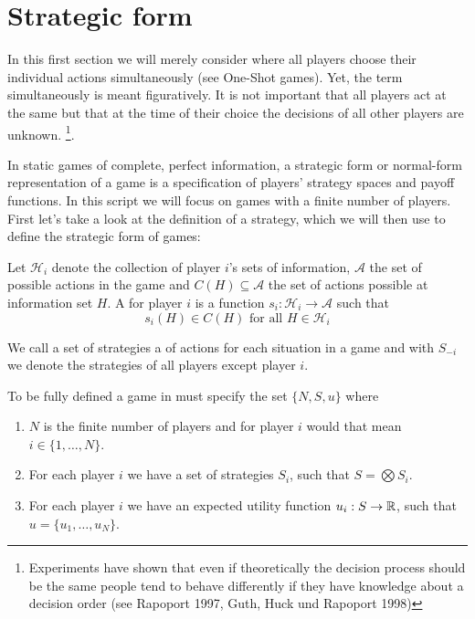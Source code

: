 
\section{Strategic form}

In this first section we will merely consider  where all players choose their individual actions simultaneously (see One-Shot games). Yet, the term simultaneously is meant figuratively. It is not important that all players act at the same but that at the time of their choice the decisions of all other players are unknown. \footnote{Experiments have shown that even if theoretically the decision process should be the same people tend to behave differently if they have knowledge about a decision order  (see Rapoport 1997, Guth, Huck und Rapoport 1998)}.

In static games of complete, perfect information, a strategic form or normal-form representation of a game is a specification of players' strategy spaces and payoff functions. In this script we will focus on games with a finite number of players. \\

First let's take a look at the definition of a strategy, which we will then use to define the strategic form of games: 

\begin{definition}[Strategy]
	Let $\mathcal{H}_{i}$ denote the collection of player $i$'s sets of information, $\mathcal{A}$ the set of possible actions in the game and $C(H) \subseteq \mathcal{A}$ the set of actions possible at information set $H$. A  for player $i$ is a function $s_{i} \colon \mathcal{H}_{i} \rightarrow \mathcal{A}$ such that
	\[ s_{i}(H) \in C(H) \text{ for all } H \in \mathcal{H}_{i} \]
\end{definition}

We call a set of strategies a  of actions for each situation in a game and with $S_{-i}$ we denote the strategies of all players except player $i$.\\

\begin{definition}
To be fully defined a game in  must specify the set $\{ N, S, u \}$ where
	\begin{enumerate}
		\item $N$ is the finite number of players and for player $i$ would that mean $i \in \{ 1, \dotsc, N \}$.
		\item For each player $i$ we have a set of strategies $S_{i}$, such that $S = \bigotimes S_{i}$.
		\item For each player $i$ we have an expected utility function $u_{i} : S \rightarrow \mathbb{R}$, such that $u = \{ u_{1}, \dotsc, u_{N} \}$.
	\end{enumerate}
\end{definition}



